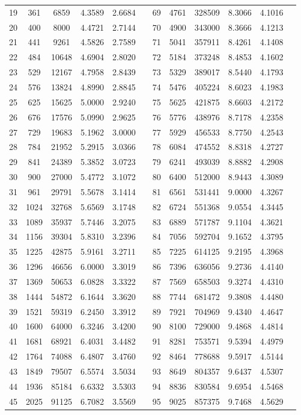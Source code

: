 \begin{longtable}{SSSSSSSSSSSS}
19&361&6859&4.3589&2.6684&&69&4761&328509&8.3066&4.1016\\
20&400&8000&4.4721&2.7144&&70&4900&343000&8.3666&4.1213\\
21&441&9261&4.5826&2.7589&&71&5041&357911&8.4261&4.1408\\
22&484&10648&4.6904&2.8020&&72&5184&373248&8.4853&4.1602\\
23&529&12167&4.7958&2.8439&&73&5329&389017&8.5440&4.1793\\
24&576&13824&4.8990&2.8845&&74&5476&405224&8.6023&4.1983\\
25&625&15625&5.0000&2.9240&&75&5625&421875&8.6603&4.2172\\
26&676&17576&5.0990&2.9625&&76&5776&438976&8.7178&4.2358\\
27&729&19683&5.1962&3.0000&&77&5929&456533&8.7750&4.2543\\
28&784&21952&5.2915&3.0366&&78&6084&474552&8.8318&4.2727\\
29&841&24389&5.3852&3.0723&&79&6241&493039&8.8882&4.2908\\
30&900&27000&5.4772&3.1072&&80&6400&512000&8.9443&4.3089\\
31&961&29791&5.5678&3.1414&&81&6561&531441&9.0000&4.3267\\
32&1024&32768&5.6569&3.1748&&82&6724&551368&9.0554&4.3445\\
33&1089&35937&5.7446&3.2075&&83&6889&571787&9.1104&4.3621\\
34&1156&39304&5.8310&3.2396&&84&7056&592704&9.1652&4.3795\\
35&1225&42875&5.9161&3.2711&&85&7225&614125&9.2195&4.3968\\
36&1296&46656&6.0000&3.3019&&86&7396&636056&9.2736&4.4140\\
37&1369&50653&6.0828&3.3322&&87&7569&658503&9.3274&4.4310\\
38&1444&54872&6.1644&3.3620&&88&7744&681472&9.3808&4.4480\\
39&1521&59319&6.2450&3.3912&&89&7921&704969&9.4340&4.4647\\
40&1600&64000&6.3246&3.4200&&90&8100&729000&9.4868&4.4814\\
41&1681&68921&6.4031&3.4482&&91&8281&753571&9.5394&4.4979\\
42&1764&74088&6.4807&3.4760&&92&8464&778688&9.5917&4.5144\\
43&1849&79507&6.5574&3.5034&&93&8649&804357&9.6437&4.5307\\
44&1936&85184&6.6332&3.5303&&94&8836&830584&9.6954&4.5468\\
45&2025&91125&6.7082&3.5569&&95&9025&857375&9.7468&4.5629\\

\end{longtable}
